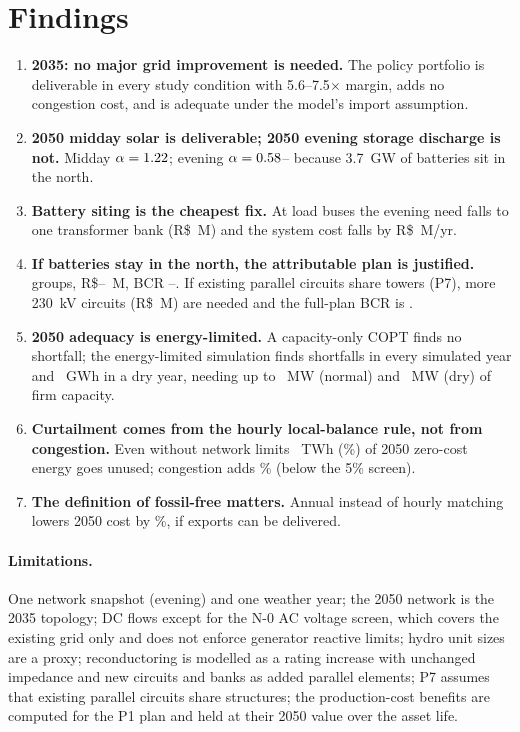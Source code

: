 \documentclass[10pt]{article}
\newcommand{\RS}{R\$}
\begin{document}
\section{Findings}
\begin{enumerate}\itemsep2pt
\item \textbf{2035: no major grid improvement is needed.} The policy portfolio is deliverable in every study condition with 5.6--7.5$\times$
margin, adds no congestion cost, and is adequate under the model's import assumption.
\item \textbf{2050 midday solar is deliverable; 2050 evening storage discharge is not.} Midday $\alpha=1.22$; evening
$\alpha=0.58$--\NalphaBHSNcaiso{} because 3.7~GW of batteries sit in the north.
\item \textbf{Battery siting is the cheapest fix.} At load buses the evening need falls to one transformer bank (\RS\NcapexL~M) and the
system cost falls by \RS\Nbenreloc~M/yr.
\item \textbf{If batteries stay in the north, the attributable plan is justified.} \NgroupsR{} groups, \RS\NcapexexclR--\NcapexR~M,
BCR \NbcrRfull--\NbcrRexcl. If existing parallel circuits share towers (P7), \Npremn{} more 230~kV circuits (\RS\Npremcapex~M) are
needed and the full-plan BCR is \Nprembcr.
\item \textbf{2050 adequacy is energy-limited.} A capacity-only COPT finds no shortfall; the energy-limited simulation finds shortfalls
in every simulated year and \NeueBdryname~GWh in a dry year, needing up to \NgapBnormalname~MW (normal) and \NgapBdryname~MW (dry) of firm capacity.
\item \textbf{Curtailment comes from the hourly local-balance rule, not from congestion.} Even without network limits
\Nunusedbcopperplate~TWh (\Nunusedpctbcopperplate\%) of 2050 zero-cost energy goes unused; congestion adds \Ncongcurtpctbexistinggrid\%
(below the 5\% screen).
\item \textbf{The definition of fossil-free matters.} Annual instead of hourly matching lowers 2050 cost by \NmatchabsAone\%, if exports
can be delivered.
\end{enumerate}

\paragraph{Limitations.} One network snapshot (evening) and one weather year; the 2050 network is the 2035 topology; DC flows except for the N-0 AC voltage screen, which covers the existing grid only and does not enforce generator reactive
limits; hydro unit sizes are a proxy; reconductoring is modelled as a rating increase with unchanged
impedance and new circuits and banks as added parallel elements; P7 assumes that existing parallel circuits share structures; the
production-cost benefits are computed for the P1 plan and held at their 2050 value over the asset life.
\end{document}
